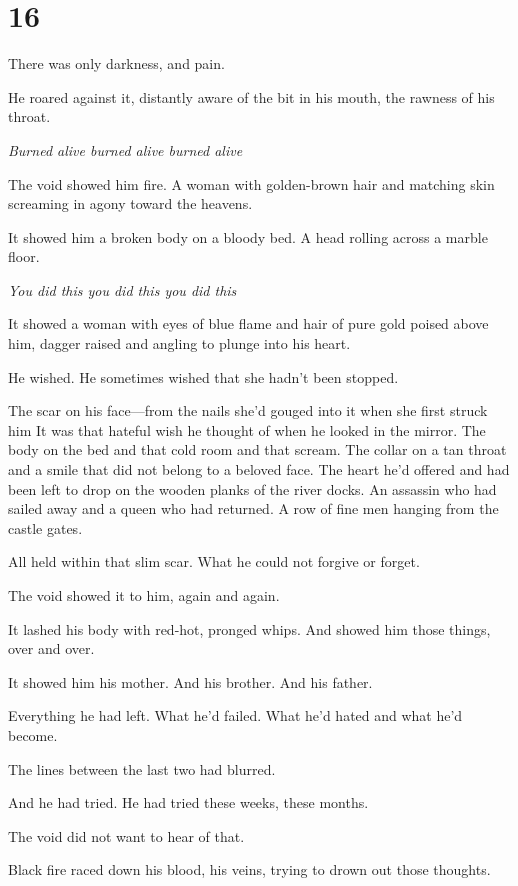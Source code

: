 
\chapter{16}

There was only darkness, and pain.

He roared against it, distantly aware of the bit in his mouth, the rawness of his throat.

\emph{Burned alive burned alive burned alive}

The void showed him fire. A woman with golden-brown hair and matching skin screaming in agony toward the heavens.

It showed him a broken body on a bloody bed. A head rolling across a marble floor.

\emph{You did this you did this you did this}

It showed a woman with eyes of blue flame and hair of pure gold poised above him, dagger raised and angling to plunge into his heart.

He wished. He sometimes wished that she hadn't been stopped.

The scar on his face---from the nails she'd gouged into it when she first struck him  It was that hateful wish he thought of when he looked in the mirror. The body on the bed and that cold room and that scream. The collar on a tan throat and a smile that did not belong to a beloved face. The heart he'd offered and had been left to drop on the wooden planks of the river docks. An assassin who had sailed away and a queen who had returned. A row of fine men hanging from the castle gates.

All held within that slim scar. What he could not forgive or forget.

The void showed it to him, again and again.

It lashed his body with red-hot, pronged whips. And showed him those things, over and over.

It showed him his mother. And his brother. And his father.

Everything he had left. What he'd failed. What he'd hated and what he'd become.

The lines between the last two had blurred.

And he had tried. He had tried these weeks, these months.

The void did not want to hear of that.

Black fire raced down his blood, his veins, trying to drown out those thoughts.

